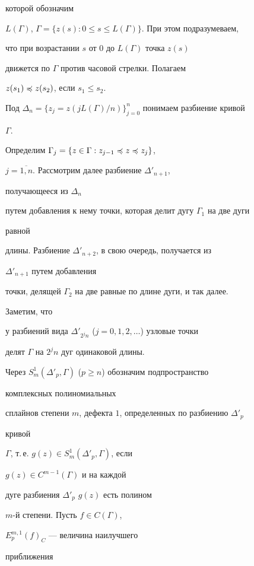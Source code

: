 которой обозначим


$L(\Gamma)$, $\Gamma=\{z(s):0\le s\le L(\Gamma)\}$. При этом подразумеваем,


что при возрастании $s$ от 0 до $L(\Gamma)$ точка $z(s)$


движется по $\Gamma$ против часовой стрелки. Полагаем


$z(s_1)\preccurlyeq z(s_2)$, если $s_1\le s_2$.


Под $\Delta_n=\{z_j=z(jL(\Gamma)/n)\}^n_{j=0}$ понимаем разбиение кривой


$\Gamma$.





Определим $\Gamma_j=\{z\in\Gamma:z_{j-1}\preccurlyeq z\preccurlyeq z_j\}$,


$j=\overline{1,n}$. Рассмотрим далее разбиение $\Delta'_{n+1}$,


получающееся из $\Delta_n$


путем добавления к нему точки, которая делит дугу $\Gamma_1$ на две дуги


равной


длины. Разбиение $\Delta'_{n+2}$, в свою очередь, получается из


$\Delta'_{n+1}$ путем добавления


точки, делящей $\Gamma_2$ на две равные по длине дуги, и так далее.


Заметим, что


у разбиений вида $\Delta'_{2^j n}$ ($j=0,1,2,\dotsc$) узловые точки


делят $\Gamma$ на $2^j n$ дуг одинаковой длины.





Через $S^1_m(\Delta'_p,\Gamma)$ ($p\ge n$) обозначим подпространство


комплексных полиномиальных


сплайнов степени $m$, дефекта $1$, определенных по разбиению $\Delta'_p$


кривой


$\Gamma$, т.\,е. $g(z)\in S^1_m(\Delta'_p,\Gamma)$, если


$g(z)\in C^{m-1}(\Gamma)$ и на каждой


дуге разбиения $\Delta'_p$\; $g(z)$ есть полином


$m$-й степени. Пусть $f\in C(\Gamma)$,


$E^{m,1}_p(f)_C$ --- величина наилучшего


приближения


